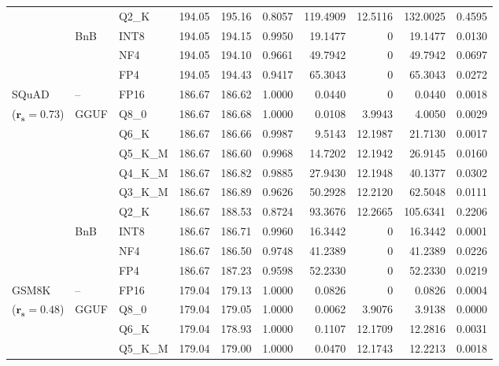 \begin{longtable}{ll l rrrrrrr}
 &  & Q2\_K & 194.05 & 195.16 & \cellcolor{red!18} 0.8057 & \cellcolor{red!18} 119.4909 & 12.5116 & \cellcolor{red!18} 132.0025 & \cellcolor{red!18} 0.4595 \\
 & BnB & INT8 & 194.05 & 194.15 & 0.9950 & 19.1477 & \cellcolor{cyan!12} $0$ & 19.1477 & 0.0130 \\
 &  & NF4 & 194.05 & 194.10 & 0.9661 & 49.7942 & \cellcolor{cyan!12} $0$ & 49.7942 & 0.0697 \\
 &  & FP4 & 194.05 & 194.43 & \cellcolor{red!18} 0.9417 & \cellcolor{red!18} 65.3043 & \cellcolor{cyan!12} $0$ & \cellcolor{red!18} 65.3043 & \cellcolor{red!18} 0.0272 \\
\midrule
SQuAD & -- & FP16 & 186.67 & 186.62 & 1.0000 & 0.0440 & \cellcolor{cyan!12} $0$ & 0.0440 & 0.0018 \\
{\small ($\mathbf{r_s{=}0.73}$)} & GGUF & Q8\_0 & 186.67 & 186.68 & 1.0000 & 0.0108 & 3.9943 & 4.0050 & 0.0029 \\
 &  & Q6\_K & 186.67 & 186.66 & 0.9987 & 9.5143 & 12.1987 & 21.7130 & 0.0017 \\
 &  & Q5\_K\_M & 186.67 & 186.60 & 0.9968 & 14.7202 & 12.1942 & 26.9145 & 0.0160 \\
 &  & Q4\_K\_M & 186.67 & 186.82 & 0.9885 & 27.9430 & 12.1948 & 40.1377 & 0.0302 \\
 &  & Q3\_K\_M & 186.67 & 186.89 & 0.9626 & 50.2928 & 12.2120 & 62.5048 & 0.0111 \\
 &  & Q2\_K & 186.67 & 188.53 & \cellcolor{red!18} 0.8724 & \cellcolor{red!18} 93.3676 & 12.2665 & \cellcolor{red!18} 105.6341 & \cellcolor{red!18} 0.2206 \\
 & BnB & INT8 & 186.67 & 186.71 & 0.9960 & 16.3442 & \cellcolor{cyan!12} $0$ & 16.3442 & 0.0001 \\
 &  & NF4 & 186.67 & 186.50 & 0.9748 & 41.2389 & \cellcolor{cyan!12} $0$ & 41.2389 & 0.0226 \\
 &  & FP4 & 186.67 & 187.23 & 0.9598 & 52.2330 & \cellcolor{cyan!12} $0$ & 52.2330 & 0.0219 \\
\midrule
GSM8K & -- & FP16 & 179.04 & 179.13 & 1.0000 & 0.0826 & \cellcolor{cyan!12} $0$ & 0.0826 & 0.0004 \\
{\small ($\mathbf{r_s{=}0.48}$)} & GGUF & Q8\_0 & 179.04 & 179.05 & 1.0000 & 0.0062 & 3.9076 & 3.9138 & 0.0000 \\
 &  & Q6\_K & 179.04 & 178.93 & 1.0000 & 0.1107 & 12.1709 & 12.2816 & 0.0031 \\
 &  & Q5\_K\_M & 179.04 & 179.00 & 1.0000 & 0.0470 & 12.1743 & 12.2213 & 0.0018 \\

\end{longtable}
